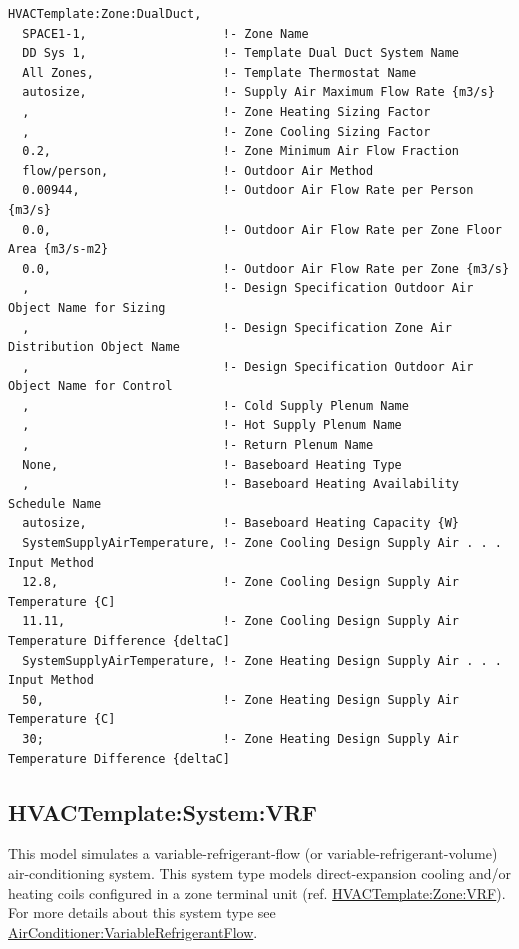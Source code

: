 \begin{lstlisting}
HVACTemplate:Zone:DualDuct,
  SPACE1-1,                   !- Zone Name
  DD Sys 1,                   !- Template Dual Duct System Name
  All Zones,                  !- Template Thermostat Name
  autosize,                   !- Supply Air Maximum Flow Rate {m3/s}
  ,                           !- Zone Heating Sizing Factor
  ,                           !- Zone Cooling Sizing Factor
  0.2,                        !- Zone Minimum Air Flow Fraction
  flow/person,                !- Outdoor Air Method
  0.00944,                    !- Outdoor Air Flow Rate per Person {m3/s}
  0.0,                        !- Outdoor Air Flow Rate per Zone Floor Area {m3/s-m2}
  0.0,                        !- Outdoor Air Flow Rate per Zone {m3/s}
  ,                           !- Design Specification Outdoor Air Object Name for Sizing
  ,                           !- Design Specification Zone Air Distribution Object Name
  ,                           !- Design Specification Outdoor Air Object Name for Control
  ,                           !- Cold Supply Plenum Name
  ,                           !- Hot Supply Plenum Name
  ,                           !- Return Plenum Name
  None,                       !- Baseboard Heating Type
  ,                           !- Baseboard Heating Availability Schedule Name
  autosize,                   !- Baseboard Heating Capacity {W}
  SystemSupplyAirTemperature, !- Zone Cooling Design Supply Air . . . Input Method
  12.8,                       !- Zone Cooling Design Supply Air Temperature {C]
  11.11,                      !- Zone Cooling Design Supply Air Temperature Difference {deltaC]
  SystemSupplyAirTemperature, !- Zone Heating Design Supply Air . . . Input Method
  50,                         !- Zone Heating Design Supply Air Temperature {C]
  30;                         !- Zone Heating Design Supply Air Temperature Difference {deltaC]
\end{lstlisting}

\subsection{HVACTemplate:System:VRF}\label{hvactemplatesystemvrf}

This model simulates a variable-refrigerant-flow (or variable-refrigerant-volume) air-conditioning system. This system type models direct-expansion cooling and/or heating coils configured in a zone terminal unit (ref. \hyperref[hvactemplatezonevrf]{HVACTemplate:Zone:VRF}). For more details about this system type see \hyperref[airconditionervariablerefrigerantflow]{AirConditioner:VariableRefrigerantFlow}.

